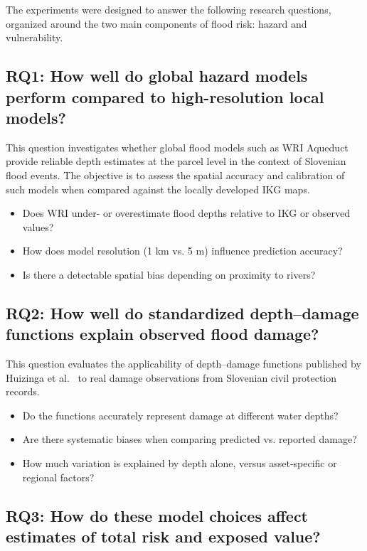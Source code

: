 The experiments were designed to answer the following research questions, organized around the two main components of flood risk: hazard and vulnerability.

\subsection*{RQ1: How well do global hazard models perform compared to high-resolution local models?}

This question investigates whether global flood models such as WRI Aqueduct provide reliable depth estimates at the parcel level in the context of Slovenian flood events. The objective is to assess the spatial accuracy and calibration of such models when compared against the locally developed IKG maps.

\begin{itemize}
    \item Does WRI under- or overestimate flood depths relative to IKG or observed values?
    \item How does model resolution (1 km vs. 5 m) influence prediction accuracy?
    \item Is there a detectable spatial bias depending on proximity to rivers?
\end{itemize}

\subsection*{RQ2: How well do standardized depth--damage functions explain observed flood damage?}

This question evaluates the applicability of depth--damage functions published by Huizinga et al.~\cite{huizinga_global_2017} to real damage observations from Slovenian civil protection records.

\begin{itemize}
    \item Do the functions accurately represent damage at different water depths?
    \item Are there systematic biases when comparing predicted vs. reported damage?
    \item How much variation is explained by depth alone, versus asset-specific or regional factors?
\end{itemize}

\subsection*{RQ3: How do these model choices affect estimates of total risk and exposed value?}


